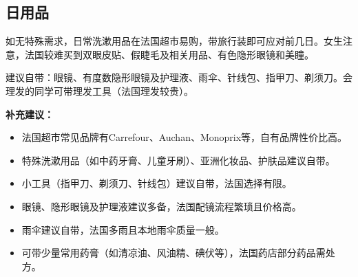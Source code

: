 \subsection{日用品}

如无特殊需求，日常洗漱用品在法国超市易购，带旅行装即可应对前几日。女生注意，法国较难买到双眼皮贴、假睫毛及相关用品、有色隐形眼镜和美瞳。

建议自带：眼镜、有度数隐形眼镜及护理液、雨伞、针线包、指甲刀、剃须刀。会理发的同学可带理发工具（法国理发较贵）。

\textbf{补充建议：}
\begin{itemize}
    \item 法国超市常见品牌有Carrefour、Auchan、Monoprix等，自有品牌性价比高。
    \item 特殊洗漱用品（如中药牙膏、儿童牙刷）、亚洲化妆品、护肤品建议自带。
    \item 小工具（指甲刀、剃须刀、针线包）建议自带，法国选择有限。
    \item 眼镜、隐形眼镜及护理液建议多备，法国配镜流程繁琐且价格高。
    \item 雨伞建议自带，法国多雨且本地雨伞质量一般。
    \item 可带少量常用药膏（如清凉油、风油精、碘伏等），法国药店部分药品需处方。
\end{itemize}
